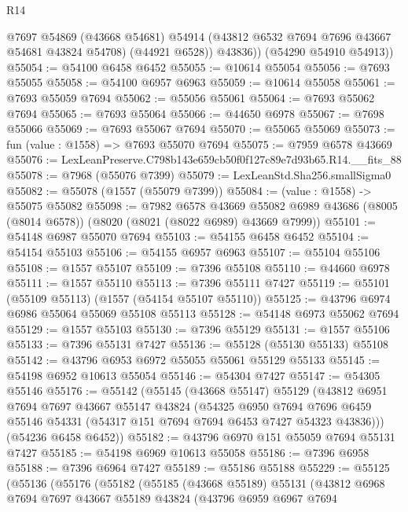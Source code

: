 \begin{lexlean}{R14}
\begin{coremodule}
            @7697
            @54869
            (@43668 @54681)
            @54914
            (@43812 @6532 @7694 @7696 @43667 @54681 @43824 @54708)
            (@44921 @6528))
          @43836))
      (@54290 @54910 @54913))
@55054 := @54100 @6458 @6452
@55055 := @10614 @55054
@55056 := @7693 @55055
@55058 := @54100 @6957 @6963
@55059 := @10614 @55058
@55061 := @7693 @55059 @7694
@55062 := @55056 @55061
@55064 := @7693 @55062 @7694
@55065 := @7693 @55064
@55066 := @44650 @6978
@55067 := @7698 @55066
@55069 := @7693 @55067 @7694
@55070 := @55065 @55069
@55073 := fun (value : @1558) => @7693 @55070 @7694
@55075 := @7959 @6578 @43669
@55076 := LexLeanPreserve.C798b143e659cb50f0f127c89e7d93b65.R14.__fits_88
@55078 := @7968 (@55076 @7399)
@55079 := LexLeanStd.Sha256.smallSigma0
@55082 := @55078 (@1557 (@55079 @7399))
@55084 := (value : @1558) -> @55075 @55082
@55098 := @7982
    @6578
    @43669
    @55082
    @6989
    @43686
    (@8005 (@8014 @6578))
    (@8020 (@8021 (@8022 @6989) @43669 @7999))
@55101 := @54148 @6987 @55070 @7694
@55103 := @54155 @6458 @6452
@55104 := @54154 @55103
@55106 := @54155 @6957 @6963
@55107 := @55104 @55106
@55108 := @1557 @55107
@55109 := @7396 @55108
@55110 := @44660 @6978
@55111 := @1557 @55110
@55113 := @7396 @55111 @7427
@55119 := @55101 (@55109 @55113) (@1557 (@54154 @55107 @55110))
@55125 := @43796 @6974 @6986 @55064 @55069 @55108 @55113
@55128 := @54148 @6973 @55062 @7694
@55129 := @1557 @55103
@55130 := @7396 @55129
@55131 := @1557 @55106
@55133 := @7396 @55131 @7427
@55136 := @55128 (@55130 @55133) @55108
@55142 := @43796 @6953 @6972 @55055 @55061 @55129 @55133
@55145 := @54198 @6952 @10613 @55054
@55146 := @54304 @7427
@55147 := @54305 @55146
@55176 := @55142
    (@55145
      (@43668 @55147)
      @55129
      (@43812
        @6951
        @7694
        @7697
        @43667
        @55147
        @43824
        (@54325
          @6950
          @7694
          @7696
          @6459
          @55146
          @54331
          (@54317 @151 @7694 @7694 @6453 @7427 @54323 @43836)))
      (@54236 @6458 @6452))
@55182 := @43796 @6970 @151 @55059 @7694 @55131 @7427
@55185 := @54198 @6969 @10613 @55058
@55186 := @7396 @6958
@55188 := @7396 @6964 @7427
@55189 := @55186 @55188
@55229 := @55125
    (@55136
      (@55176
        (@55182
          (@55185
            (@43668 @55189)
            @55131
            (@43812
              @6968
              @7694
              @7697
              @43667
              @55189
              @43824
              (@43796
                @6959
                @6967
                @7694

\end{coremodule}
\end{lexlean}
